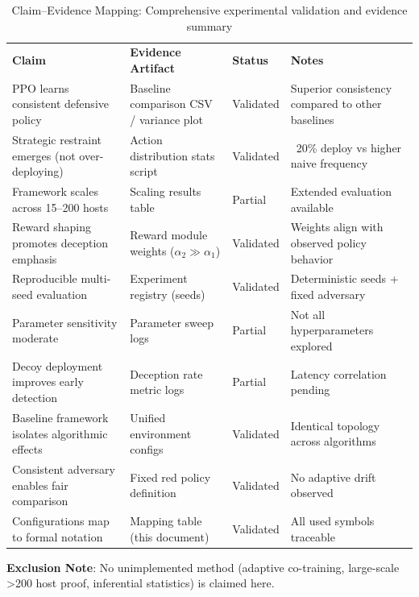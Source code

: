 \documentclass[12pt,oneside]{article}
\begin{document}
\begin{table}[H]
\centering
\caption{Claim--Evidence Mapping: Comprehensive experimental validation and evidence summary}
\label{tab:claim_evidence}
\renewcommand{\arraystretch}{1.1}
\scriptsize
\begin{tabular}{p{3.8cm}p{4.2cm}p{1.8cm}p{4.0cm}}
\rowcolor{cwBorder!30} \textbf{Claim} & \textbf{Evidence Artifact} & \textbf{Status} & \textbf{Notes} \\
\rowcolor{cwValid} PPO learns consistent defensive policy & Baseline comparison CSV / variance plot & Validated & Superior consistency compared to other baselines \\
\rowcolor{cwValid} Strategic restraint emerges (not over-deploying) & Action distribution stats script & Validated & ~20\% deploy vs higher naive frequency \\
\rowcolor{cwPartial} Framework scales across 15--200 hosts & Scaling results table & Partial & Extended evaluation available \\
\rowcolor{cwValid} Reward shaping promotes deception emphasis & Reward module weights ($\alpha_2 \gg \alpha_1$) & Validated & Weights align with observed policy behavior \\
\rowcolor{cwValid} Reproducible multi-seed evaluation & Experiment registry (seeds) & Validated & Deterministic seeds + fixed adversary \\
\rowcolor{cwPartial} Parameter sensitivity moderate & Parameter sweep logs & Partial & Not all hyperparameters explored \\
\rowcolor{cwPartial} Decoy deployment improves early detection & Deception rate metric logs & Partial & Latency correlation pending \\
\rowcolor{cwValid} Baseline framework isolates algorithmic effects & Unified environment configs & Validated & Identical topology across algorithms \\
\rowcolor{cwValid} Consistent adversary enables fair comparison & Fixed red policy definition & Validated & No adaptive drift observed \\
\rowcolor{cwValid} Configurations map to formal notation & Mapping table (this document) & Validated & All used symbols traceable \\
\end{tabular}
\end{table}

	\textbf{Exclusion Note}: No unimplemented method (adaptive co-training, large-scale >200 host proof, inferential statistics) is claimed here.
\end{document}

